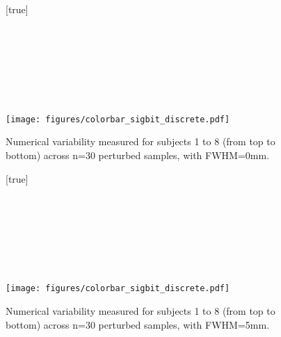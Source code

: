 \documentclass[lettersize,journal]{IEEEtran}
\begin{document}
\begin{landscape}
  \begin{figure}
    \vspace*{-2cm}
    \centering
    [true] \\
     \\
     \\
     \\
     \\
     \\
     \\
     \\
    \texttt{[image: figures/colorbar\_sigbit\_discrete.pdf]}
    \caption{Numerical variability measured for subjects 1 to 8 (from top to bottom) across n=30 perturbed samples, with FWHM=0mm. }
    \label{fig:uncertainty-maps-0mm-disc}
  \end{figure}
\end{landscape}

\begin{landscape}
  \begin{figure}
    \vspace*{-2cm}
    \centering
    [true] \\
     \\
     \\
     \\
     \\
     \\
     \\
     \\
    \texttt{[image: figures/colorbar\_sigbit\_discrete.pdf]}
    \caption{Numerical variability measured for subjects 1 to 8 (from top to bottom) across n=30 perturbed samples, with FWHM=5mm. }
    \label{fig:uncertainty-maps-5mm-disc}
  \end{figure}
\end{landscape}
\end{document}
